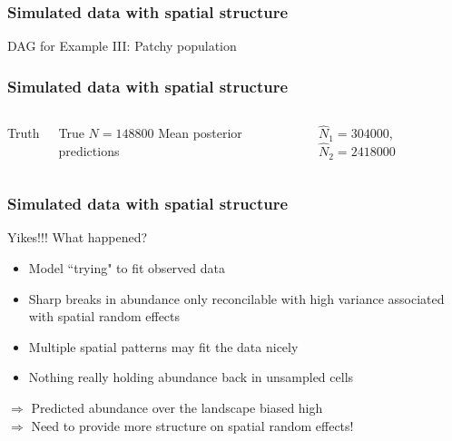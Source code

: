 \documentclass[serif,mathserif]{beamer}
\begin{document}
\begin{frame}
  \frametitle{Simulated data with spatial structure}
  DAG for Example III: Patchy population
\end{frame}

\begin{frame}
  \frametitle{Simulated data with spatial structure}
  \begin{columns}[c]
  \column{2in}
  Truth \vspace{.5cm}

  True $N=148800$
  \column{2in}
  Mean posterior predictions \vspace{.5cm}

  $\hat{N}_1=304000$,$\hat{N}_2=2418000$
  \end{columns}
\end{frame}

\begin{frame}
  \frametitle{Simulated data with spatial structure}
  Yikes!!! What happened?
      \begin{itemize}
        \item Model ``trying" to fit observed data
        \item Sharp breaks in abundance only reconcilable with high variance
            associated with spatial random effects
        \item Multiple spatial patterns may fit the data nicely
        \item Nothing really holding abundance back in unsampled cells
      \end{itemize}
      {\color{noaaturq}
        $\Rightarrow$ Predicted abundance over the landscape biased high \\
        $\Rightarrow$ Need to provide more structure on spatial random effects! }
\end{frame}
\end{document}
